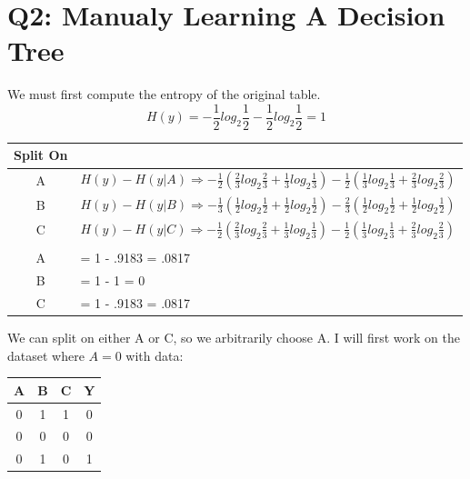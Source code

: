 \documentclass{article}
\begin{document}
    \section*{Q2: Manualy Learning A Decision Tree}
        We must first compute the entropy of the original table.
        \begin{equation*}
            H(y) = -\frac{1}{2} log_2 \frac{1}{2} - \frac{1}{2} log_2 \frac{1}{2} = 1
        \end{equation*}
        \begin{center}
            \begin{tabular}{c | l}
                Split On & \\
                \hline
                A & $H(y) - H(y|A) \Rightarrow-\frac{1}{2}\left(\frac{2}{3}log_2 \frac{2}{3} + \frac{1}{3}log_2 \frac{1}{3}\right) -\frac{1}{2}\left(\frac{1}{3}log_2 \frac{1}{3} + \frac{2}{3}log_2 \frac{2}{3}\right)$\\
                B & $H(y) - H(y|B) \Rightarrow -\frac{1}{3}\left(\frac{1}{2}log_2 \frac{1}{2} + \frac{1}{2}log_2 \frac{1}{2}\right) -\frac{2}{3}\left(\frac{1}{2}log_2 \frac{1}{2} + \frac{1}{2}log_2 \frac{1}{2}\right)$\\
                C & $H(y) - H(y|C) \Rightarrow -\frac{1}{2}\left(\frac{2}{3}log_2 \frac{2}{3} + \frac{1}{3}log_2 \frac{1}{3}\right) -\frac{1}{2}\left(\frac{1}{3}log_2 \frac{1}{3} + \frac{2}{3}log_2 \frac{2}{3}\right)$\\
                &\\
                A & = 1 - .9183 = .0817 \\
                B & = 1 - 1 = 0\\
                C & = 1 - .9183 = .0817
            \end{tabular}   
        \end{center}
        \qquad We can split on either A or C, so we arbitrarily choose A.
        I will first work on the dataset where $A=0$ with data:
        \begin{center}
            \begin{tabular}{c | c c | c}
                A & B & C & Y \\
                \hline
                0 & 1 & 1 & 0 \\
                0 & 0 & 0 & 0 \\
                0 & 1 & 0 & 1 \\
            \end{tabular}
        \end{center}
\end{document}
